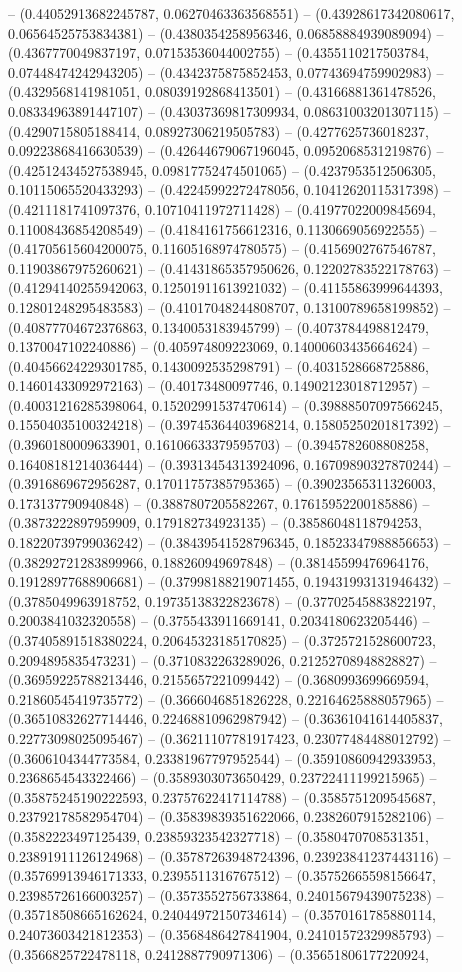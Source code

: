 -- (0.44052913682245787, 0.06270463363568551) -- (0.43928617342080617, 0.06564525753834381) -- (0.4380354258956346, 0.06858884939089094) -- (0.4367770049837197, 0.07153536044002755) -- (0.4355110217503784, 0.07448474242943205) -- (0.4342375875852453, 0.07743694759902983) -- (0.4329568141981051, 0.08039192868413501) -- (0.43166881361478526, 0.08334963891447107) -- (0.43037369817309934, 0.08631003201307115) -- (0.4290715805188414, 0.08927306219505783) -- (0.4277625736018237, 0.09223868416630539) -- (0.42644679067196045, 0.0952068531219876) -- (0.42512434527538945, 0.09817752474501065) -- (0.4237953512506305, 0.10115065520433293) -- (0.42245992272478056, 0.10412620115317398) -- (0.4211181741097376, 0.10710411972711428) -- (0.41977022009845694, 0.11008436854208549) -- (0.4184161756612316, 0.1130669056922555) -- (0.41705615604200075, 0.11605168974780575) -- (0.4156902767546787, 0.11903867975260621) -- (0.41431865357950626, 0.12202783522178763) -- (0.41294140255942063, 0.12501911613921032) -- (0.41155863999644393, 0.12801248295483583) -- (0.41017048244808707, 0.13100789658199852) -- (0.40877704672376863, 0.1340053183945799) -- (0.4073784498812479, 0.1370047102240886) -- (0.405974809223069, 0.14000603435664624) -- (0.40456624229301785, 0.1430092535298791) -- (0.4031528668725886, 0.14601433092972163) -- (0.40173480097746, 0.14902123018712957) -- (0.40031216285398064, 0.15202991537470614) -- (0.39888507097566245, 0.15504035100324218) -- (0.39745364403968214, 0.15805250201817392) -- (0.3960180009633901, 0.16106633379595703) -- (0.3945782608808258, 0.16408181214036444) -- (0.39313454313924096, 0.16709890327870244) -- (0.3916869672956287, 0.17011757385795365) -- (0.39023565311326003, 0.173137790940848) -- (0.3887807205582267, 0.17615952200185886) -- (0.3873222897959909, 0.179182734923135) -- (0.38586048118794253, 0.18220739799036242) -- (0.38439541528796345, 0.18523347988856653) -- (0.38292721283899966, 0.188260949697848) -- (0.38145599476964176, 0.19128977688906681) -- (0.37998188219071455, 0.19431993131946432) -- (0.3785049963918752, 0.19735138322823678) -- (0.37702545883822197, 0.2003841032320558) -- (0.3755433911669141, 0.2034180623205446) -- (0.37405891518380224, 0.20645323185170825) -- (0.3725721528600723, 0.2094895835473231) -- (0.3710832263289026, 0.21252708948828827) -- (0.36959225788213446, 0.2155657221099442) -- (0.3680993699669594, 0.21860545419735772) -- (0.3666046851826228, 0.22164625888057965) -- (0.36510832627714446, 0.22468810962987942) -- (0.36361041614405837, 0.22773098025095467) -- (0.36211107781917423, 0.23077484488012792) -- (0.3606104344773584, 0.23381967797952544) -- (0.35910860942933953, 0.2368654543322466) -- (0.3589303073650429, 0.23722411199215965) -- (0.35875245190222593, 0.23757622417114788) -- (0.3585751209545687, 0.23792178582954704) -- (0.35839839351622066, 0.2382607915282106) -- (0.3582223497125439, 0.23859323542327718) -- (0.3580470708531351, 0.23891911126124968) -- (0.35787263948724396, 0.23923841237443116) -- (0.35769913946171333, 0.2395511316767512) -- (0.35752665598156647, 0.23985726166003257) -- (0.3573552756733864, 0.24015679439075238) -- (0.35718508665162624, 0.24044972150734614) -- (0.3570161785880114, 0.24073603421812353) -- (0.3568486427841904, 0.24101572329985793) -- (0.3566825722478118, 0.2412887790971306) -- (0.35651806177220924, 